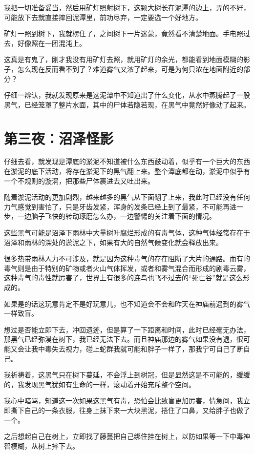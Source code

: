 我把一切准备妥当，然后用矿灯照射树下，这颗大树长在泥潭的边上，弄的不好，可能放下去就直接摔回泥潭里，前功尽弃，一定要选一个好地方。

矿灯一照到树下，我就楞住了，之间树下一片迷蒙，竟然看不清楚地面。手电照过去，好像照在一团混沌上。

这真是有鬼了，刚才我没有用矿灯去照，就用矿灯的余光，都能看到地面模糊的影子，怎么现在反而看不到了？难道雾气又浓了起来，可是为何只浓在地面附近的部分？

仔细一辨认，我就发现原来是这泥潭中不知道出了什么变化，从水中蒸腾起了一股黑气，已经笼罩了整片水面，其中的尸体若隐若现，在黑气中竟然好像动了起来。

\chapter{第三夜：沼泽怪影}

仔细去看，就发现是潭底的淤泥不知道被什么东西鼓动着，似乎有一个巨大的东西在淤泥的底下活动，将存在淤泥下的黑气翻上来。整个潭底都在动，淤泥中似乎有一个不规则的漩涡，把那些尸体裹进去又吐出来。

随着淤泥活动的更加剧烈，越来越多的黑气从下面翻了上来，我此时已经没有任何力气感觉到害怕了，只是牙齿发紧，浑身的发条已经上到了最紧，不可能再进一步，一边脑子飞快的转动琢磨怎么办，一边警惕的关注着下面的情况。

这些黑气可能是沼泽下雨林中大量树叶腐烂形成的有毒气体，这种气体经常存在于沼泽和雨林的深处的淤泥之下，如果有大的自然气候变化就会释放出来。

很多热带雨林人力不可涉及，就是因为这种毒气的存在阻断了大片的通路。而有的毒气则是由于特别的矿物或者火山气体挥发，或者和雾气混合而形成的剧毒云雾，这种毒气的毒性就厉害了，世界上有很多的连鸟也飞不过去的“死亡谷”就是这么形成的。

如果是的话这玩意肯定不是好玩意儿，也不知道会不会和昨天在神庙前遇到的雾气一样致盲。

想过是否能立即下去，冲回遗迹，但是算了一下距离和时间，此时已经毫无办法，那黑气已经弥漫在树下，我已经无法下去。而且神庙那边的雾气如果没有退，很可能又会让我中毒失去视力，碰上蛇群我就可能和胖子一样了，那我宁可自己了断自己。

我祈祷着，这黑气只在树下蔓延，不会浮上到树冠，但是显然这是不可能的，缓缓的，我发现黑气犹如有生命的一样，滚动着开始充斥整个空间。

我心中暗骂，知道这一次如果这黑气有毒，恐怕会比致盲更加厉害，情急间，我立即撕下自己的一条衣服，往身上抹下来一大块黑泥，捂住了口鼻，又给胖子也做了一个。

之后想起自己在树上，立即找了藤蔓把自己绑住挂在树上，以防如果等一下中毒神智模糊，从树上摔下去。

